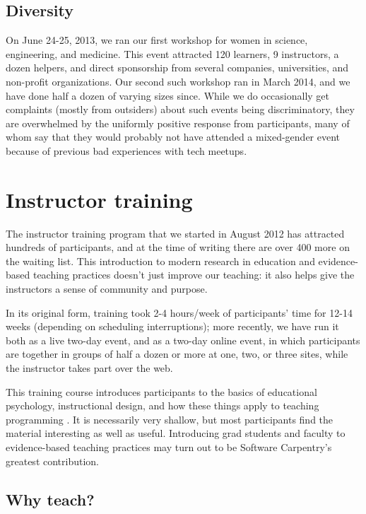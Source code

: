\documentclass[10pt,a4paper,twocolumn]{article}
\begin{document}
\subsection{Diversity}

On June 24-25, 2013, we ran our first workshop for women in science,
engineering, and medicine. This event attracted 120 learners, 9
instructors, a dozen helpers, and direct sponsorship from several
companies, universities, and non-profit organizations. Our second such
workshop ran in March 2014, and we have done half a dozen of varying
sizes since.  While we do occasionally get complaints (mostly from
outsiders) about such events being discriminatory, they are
overwhelmed by the uniformly positive response from participants, many
of whom say that they would probably not have attended a mixed-gender
event because of previous bad experiences with tech meetups.

\section{Instructor training}\label{s:instructor-training}

The instructor training program that we started in August 2012 has
attracted hundreds of participants, and at the time of writing there
are over 400 more on the waiting list.  This introduction to modern
research in education and evidence-based teaching practices
\cite{hlw2010} doesn't just improve our teaching: it also helps give
the instructors a sense of community and purpose.

In its original form, training took 2-4 hours/week of participants'
time for 12-14 weeks (depending on scheduling interruptions); more
recently, we have run it both as a live two-day event, and as a
two-day online event, in which participants are together in groups of
half a dozen or more at one, two, or three sites, while the instructor
takes part over the web.

This training course introduces participants to the basics of
educational psychology, instructional design, and how these things
apply to teaching programming
\cite{guzdial2010,guzdial2013,hazzan2011,porter2013,sorva2012}. It is
necessarily very shallow, but most participants find the material
interesting as well as useful.  Introducing grad students and faculty
to evidence-based teaching practices may turn out to be Software
Carpentry's greatest contribution.

\subsection{Why teach?}
\end{document}
